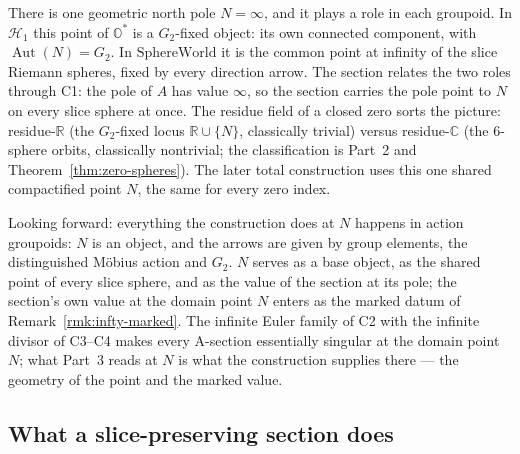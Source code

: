 \documentclass[11pt]{article}
\newcommand{\OO}{\mathbb{O}}
\newcommand{\CC}{\mathbb{C}}
\newcommand{\RR}{\mathbb{R}}
\DeclareMathOperator{\Aut}{Aut}
\providecommand{\Gtwo}{G_2}
\providecommand{\SphereWorld}{\mathrm{SphereWorld}}
\theoremstyle{plain}
\theoremstyle{definition}
\theoremstyle{remark}
\begin{document}
There is one geometric north pole $N=\infty$, and it plays a role in each
groupoid. In $\mathcal H_1$ this point of $\OO^{*}$ is a $\Gtwo$-fixed
object: its own connected component, with $\Aut(N)=\Gtwo$. In
$\SphereWorld$ it is the common point at infinity
of the slice Riemann spheres, fixed by every direction arrow. The section
relates the two roles through \textup{C1}: the pole of $A$ has value
$\infty$, so the section carries the pole point to $N$ on every slice
sphere at once. The residue field of a closed zero sorts the picture:
residue-$\RR$ (the $\Gtwo$-fixed locus $\RR\cup\{N\}$, classically trivial) versus residue-$\CC$
(the $6$-sphere orbits, classically nontrivial; the classification is Part~2 and
Theorem~\ref{thm:zero-spheres}).
The later total construction uses this one shared compactified point $N$, the same for every
zero index.

Looking forward: everything the construction does at $N$ happens in action groupoids:
$N$ is an object, and the arrows are given by group elements, the distinguished
M\"obius action and $G_2$. $N$
serves as a base object, as the shared point of every slice sphere, and as the value of
the section at its pole; the section's own value at the domain point $N$ enters as
the marked datum of Remark~\ref{rmk:infty-marked}. The infinite Euler
family of \textup{C2} with the infinite divisor of
\textup{C3}--\textup{C4} makes every A-section essentially singular at the domain point
$N$; what Part~3 reads at $N$ is what the construction supplies there --- the geometry
of the point and the marked value.

\subsection*{What a slice-preserving section does}
\end{document}
